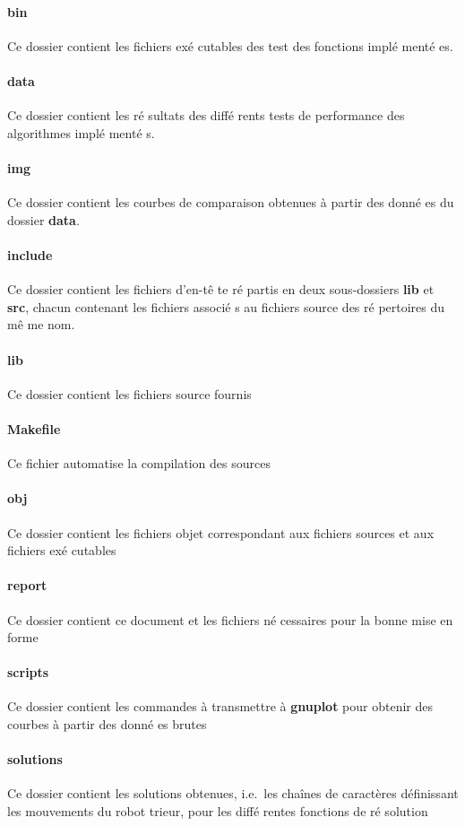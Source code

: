 \documentclass[12pt,a4paper]{article}
\begin{document}
\paragraph*{bin}
Ce dossier contient les fichiers ex\'e cutables des test des fonctions impl\'e ment\'e es.
\paragraph*{data}
Ce dossier contient les r\'e sultats des diff\'e rents tests de performance des algorithmes impl\'e ment\'e s.
\paragraph*{img}
Ce dossier contient les courbes de comparaison obtenues \`a partir des donn\'e es du dossier {\bfseries data}.
\paragraph*{include}
Ce dossier contient les fichiers d'en-t\^e te r\'e partis en deux sous-dossiers {\bfseries lib} et {\bfseries src}, chacun contenant les fichiers associ\'e s au fichiers source des r\'e pertoires du m\^e me nom.
\paragraph*{lib}
Ce dossier contient les fichiers source fournis \paragraph*{Makefile}
Ce fichier automatise la compilation des sources
\paragraph*{obj}
Ce dossier contient les fichiers objet correspondant aux fichiers sources et aux fichiers ex\'e cutables
\paragraph*{report}
Ce dossier contient ce document et les fichiers \LaTex n\'e cessaires pour la bonne mise en forme \paragraph*{scripts}
Ce dossier contient les commandes \`a transmettre \`a {\bfseries gnuplot} pour obtenir des courbes \`a partir des donn\'e es brutes
\paragraph*{solutions}
Ce dossier contient les solutions obtenues, i.e.\ les cha\^ines de caract\`eres d\'efinissant les mouvements du robot trieur, pour les diff\'e rentes fonctions de r\'e solution
\end{document}
